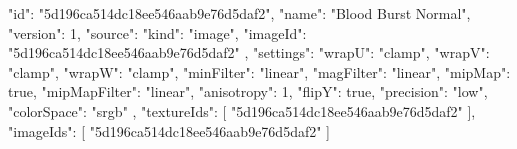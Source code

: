 {
  "id": "5d196ca514dc18ee546aab9e76d5daf2",
  "name": "Blood Burst Normal",
  "version": 1,
  "source": {
    "kind": "image",
    "imageId": "5d196ca514dc18ee546aab9e76d5daf2"
  },
  "settings": {
    "wrapU": "clamp",
    "wrapV": "clamp",
    "wrapW": "clamp",
    "minFilter": "linear",
    "magFilter": "linear",
    "mipMap": true,
    "mipMapFilter": "linear",
    "anisotropy": 1,
    "flipY": true,
    "precision": "low",
    "colorSpace": "srgb"
  },
  "textureIds": [
    "5d196ca514dc18ee546aab9e76d5daf2"
  ],
  "imageIds": [
    "5d196ca514dc18ee546aab9e76d5daf2"
  ]
}
